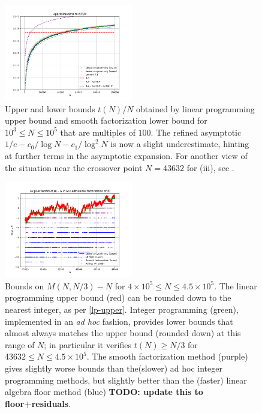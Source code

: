 \documentclass[12pt,a4paper,reqno]{amsart}
\numberwithin{equation}{section}
\theoremstyle{plain}
\theoremstyle{definition}
\begin{document}
  \begin{figure}
    \centering
    \includegraphics[width=0.5\textwidth]{longerplot.png}
    \caption{Upper and lower bounds $t(N)/N$ obtained by linear programming upper bound and smooth factorization lower bound for $10^3 \leq N \leq 10^5$ that are multiples of $100$. The refined asymptotic $1/e - c_0/\log N - c_1/\log^2 N$ is now a slight underestimate, hinting at further terms in the asymptotic expansion. For another view of the situation near the crossover point $N=43632$ for (iii), see .}
    \label{fig-longer}
    \end{figure}


    \begin{figure}
      \centering
      \includegraphics[width=0.5\textwidth]{surplus.png}
      \caption{Bounds on $M(N,N/3)-N$ for $4 \times 10^5 \leq N \leq 4.5 \times 10^5$.  The linear programming upper bound (red) can be rounded down to the nearest integer, as per \eqref{lp-upper}.  Integer programming (green), implemented in an \emph{ad hoc} fashion, provides lower bounds that almost always matches the upper bound (rounded down) at this range of $N$; in particular it verifies $t(N) \geq N/3$ for $43632 \leq N \leq 4.5 \times 10^5$.  The smooth factorization method (purple) gives slightly worse bounds than the(slower) ad hoc integer programming methods, but slightly better than the (faster) linear algebra floor method (blue) {\bf TODO: update this to floor+residuals}.}
      \label{fig-surplus}
      \end{figure}
    
\end{document}
